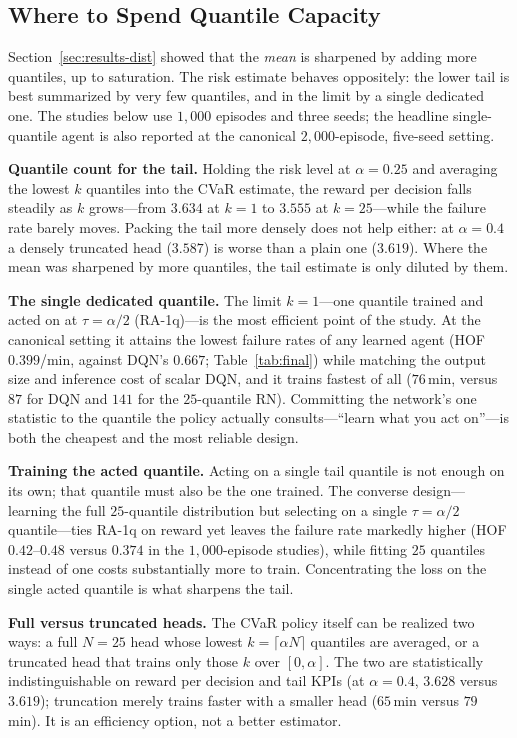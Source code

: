 \documentclass[conference]{IEEEtran}
\begin{document}
\subsection{Where to Spend Quantile Capacity}
\label{sec:results-bridge}
Section~\ref{sec:results-dist} showed that the \emph{mean} is sharpened by adding
more quantiles, up to saturation. The risk estimate behaves oppositely: the lower
tail is best summarized by very few quantiles, and in the limit by a single
dedicated one. The studies below use $1{,}000$ episodes and three seeds; the
headline single-quantile agent is also reported at the canonical
$2{,}000$-episode, five-seed setting.

\textbf{Quantile count for the tail.} Holding the risk level at $\alpha=0.25$ and
averaging the lowest $k$ quantiles into the CVaR estimate, the reward per decision
falls steadily as $k$ grows---from $3.634$ at $k=1$ to $3.555$ at $k=25$---while
the failure rate barely moves. Packing the tail more densely does not help either:
at $\alpha=0.4$ a densely truncated head ($3.587$) is worse than a plain one
($3.619$). Where the mean was sharpened by more quantiles, the tail estimate is
only diluted by them.

\textbf{The single dedicated quantile.} The limit $k=1$---one quantile trained and
acted on at $\tau=\alpha/2$ (RA-1q)---is the most efficient point of the study. At
the canonical setting it attains the lowest failure rates of any learned agent
(HOF $0.399$/min, against DQN's $0.667$; Table~\ref{tab:final}) while matching the
output size and inference cost of scalar DQN, and it trains fastest of all
($76$\,min, versus $87$ for DQN and $141$ for the $25$-quantile RN). Committing the
network's one statistic to the quantile the policy actually consults---``learn what
you act on''---is both the cheapest and the most reliable design.

\textbf{Training the acted quantile.} Acting on a single tail quantile is not
enough on its own; that quantile must also be the one trained. The converse
design---learning the full $25$-quantile distribution but selecting on a single
$\tau=\alpha/2$ quantile---ties RA-1q on reward yet leaves the failure rate
markedly higher (HOF $0.42$--$0.48$ versus $0.374$ in the $1{,}000$-episode studies), while
fitting $25$ quantiles instead of one costs substantially more to train.
Concentrating the loss on the single acted quantile is what sharpens the tail.

\textbf{Full versus truncated heads.}\label{sec:results-trunc} The CVaR policy
itself can be realized two ways: a full $N=25$ head whose lowest
$k=\lceil\alpha N\rceil$ quantiles are averaged, or a truncated head that trains
only those $k$ over $[0,\alpha]$. The two are statistically indistinguishable on
reward per decision and tail KPIs (at $\alpha=0.4$, $3.628$ versus $3.619$);
truncation merely trains faster with a smaller head ($65$\,min versus $79$\,min). It is
an efficiency option, not a better estimator.
\end{document}
